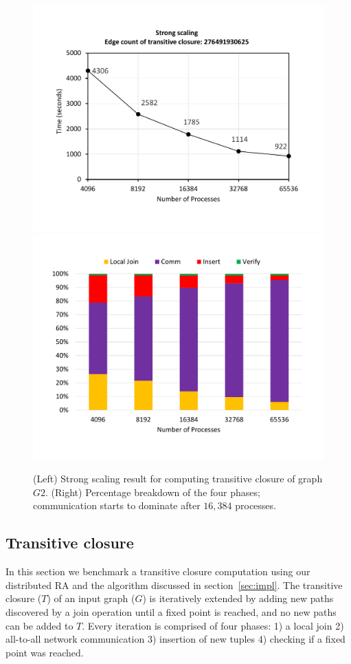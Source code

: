 \begin{figure}[t]
	{\includegraphics[width=.50\textwidth,  trim={0cm 0cm 0cm 0cm, 
			clip}]{results/TC_2_final.pdf}}\hfill%
	{\includegraphics[width=.50\textwidth,  trim={0cm 0cm 0cm 0cm,
			clip}]{results/TC_2_break_down_final.pdf}}\hfill%
	\centering
	\caption{(Left) Strong scaling result for computing transitive closure of graph $G2$. (Right) Percentage breakdown of the four phases; communication starts to dominate after $16,384$ processes.}
	\label{fig:tc_big}
\end{figure}



\subsection{Transitive closure}
\label{sec:tc}

In this section we benchmark a transitive closure computation using our distributed RA and the algorithm discussed in section~\ref{sec:impl}.
The transitive closure ($T$) of an input graph ($G$) is iteratively extended by adding new paths discovered by a join operation until a fixed point is reached, and no new paths can be added to $T$.
Every iteration is comprised of four phases: 1) a local join 2) all-to-all network communication 3) insertion of new tuples 4) checking if a fixed point was reached.


